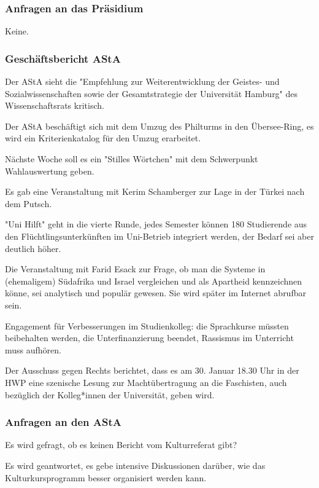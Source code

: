 \documentclass[ngerman,headheight=70pt]{scrartcl}
\begin{document}
    \subsubsection{Anfragen an das Präsidium}

    Keine.

    \subsubsection{Geschäftsbericht AStA}

    Der AStA sieht die "Empfehlung zur Weiterentwicklung der Geistes- und
    Sozialwissenschaften sowie der Gesamtstrategie der Universität Hamburg" des
    Wissenschaftsrats kritisch.

    Der AStA beschäftigt sich mit dem Umzug des Philturms in den Übersee-Ring,
    es wird ein Kriterienkatalog für den Umzug erarbeitet.

    Nächste Woche soll es ein "Stilles Wörtchen" mit dem Schwerpunkt
    Wahlauswertung geben.

    Es gab eine Veranstaltung mit Kerim Schamberger zur Lage in der Türkei nach
    dem Putsch.

    "Uni Hilft" geht in die vierte Runde, jedes Semester können 180 Studierende
    aus den Flüchtlingsunterkünften im Uni-Betrieb integriert werden, der Bedarf
    sei aber deutlich höher.

    Die Veranstaltung mit Farid Esack zur Frage, ob man die Systeme in
    (ehemaligem) Südafrika und Israel vergleichen und als Apartheid kennzeichnen
    könne, sei analytisch und populär gewesen. Sie wird später im Internet
    abrufbar sein.

    Engagement für Verbesserungen im Studienkolleg: die Sprachkurse müssten
    beibehalten werden, die Unterfinanzierung beendet, Rassismus im
    Unterricht muss aufhören.

    Der Ausschuss gegen Rechts berichtet, dass es am 30. Januar 18.30 Uhr in der
    HWP eine szenische Lesung zur Machtübertragung an die Faschisten, auch
    bezüglich der Kolleg*innen der Universität, geben wird.


    \subsubsection{Anfragen an den AStA}

    Es wird gefragt, ob es keinen Bericht vom Kulturreferat gibt?

    Es wird geantwortet, es gebe intensive Diskussionen darüber, wie das
    Kulturkursprogramm besser organisiert werden kann.
\end{document}
